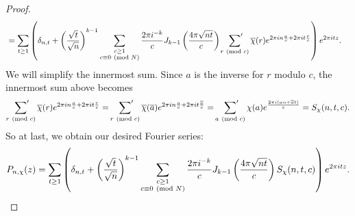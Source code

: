 \begin{proof}
\begin{align*}
        &= \sum_{t \ge 1}\left(\delta_{n,t}+\left(\frac{\sqrt{t}}{\sqrt{n}}\right)^{k-1}\sum_{\substack{c \ge 1 \\ c \equiv 0 \ \left(\text{mod }N\right)}}\frac{2\pi i^{-k}}{c}J_{k-1}\left(\frac{4\pi\sqrt{nt}}{c}\right)\sideset{}{'}\sum_{r \ \left(\text{mod }c\right)}\overline{\chi}(r)e^{2\pi in\frac{a}{c}+2\pi it\frac{r}{c}}\right)e^{2\pi itz}.
      \end{align*}
      We will simplify the innermost sum. Since $a$ is the inverse for $r$ modulo $c$, the innermost sum above becomes
      \begin{equation}\label{equ:Salie_sum_simplification_for_Poincare_series}
        \sideset{}{'}\sum_{r \ \left(\text{mod }c\right)}\overline{\chi}(r)e^{2\pi in\frac{a}{c}+2\pi it\frac{r}{c}} = \sideset{}{'}\sum_{r \ \left(\text{mod }c\right)}\overline{\chi}(\overline{a})e^{2\pi in\frac{a}{c}+2\pi it\frac{\overline{a}}{c}} = \sideset{}{'}\sum_{a \ \left(\text{mod }c\right)}\chi(a)e^{\frac{2\pi i(an+\overline{a}t)}{c}} = S_{\chi}(n,t,c).
      \end{equation}
      So at last, we obtain our desired Fourier series:
      \[
        P_{n,\chi}(z) = \sum_{t \ge 1}\left(\delta_{n,t}+\left(\frac{\sqrt{t}}{\sqrt{n}}\right)^{k-1}\sum_{\substack{c \ge 1 \\ c \equiv 0 \ \left(\text{mod }N\right)}}\frac{2\pi i^{-k}}{c}J_{k-1}\left(\frac{4\pi\sqrt{nt}}{c}\right)S_{\chi}(n,t,c)\right)e^{2\pi itz}.
      \]
    \end{proof}
    
